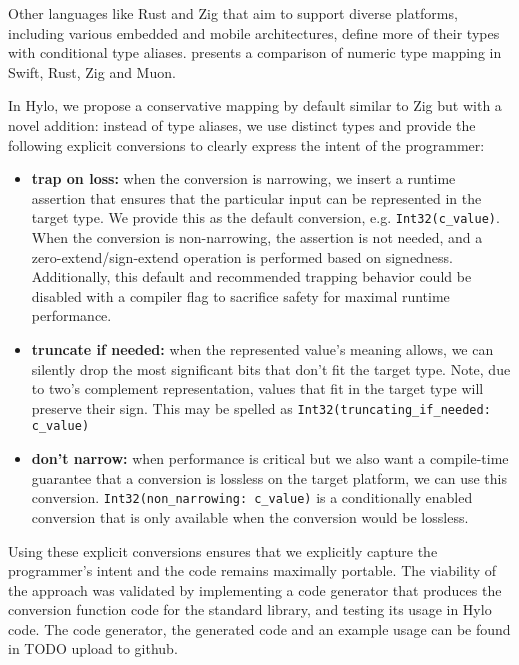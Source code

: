 Other languages like Rust and Zig that aim to support diverse platforms, including various embedded and mobile architectures, define more of their types with conditional type aliases.  presents a comparison of numeric type mapping in Swift, Rust, Zig and Muon.

In Hylo, we propose a conservative mapping by default similar to Zig but with a novel addition: instead of type aliases, we use distinct types and provide the following explicit conversions to clearly express the intent of the programmer:
\begin{itemize}
    \item \textbf{trap on loss:} when the conversion is narrowing, we insert a runtime assertion that ensures that the particular input can be represented in the target type. We provide this as the default conversion, e.g. \texttt{Int32(c\_value)}. When the conversion is non-narrowing, the assertion is not needed, and a zero-extend/sign-extend operation is performed based on signedness. Additionally, this default and recommended trapping behavior could be disabled with a compiler flag to sacrifice safety for maximal runtime performance.
    \item \textbf{truncate if needed:} when the represented value's meaning allows, we can silently drop the most significant bits that don't fit the target type. Note, due to two's complement representation, values that fit in the target type will preserve their sign. This may be spelled as \texttt{Int32(truncating\_if\_needed: c\_value)}
    \item \textbf{don't narrow:} when performance is critical but we also want a compile-time guarantee that a conversion is lossless on the target platform, we can use this conversion. \texttt{Int32(non\_narrowing: c\_value)} is a conditionally enabled conversion that is only available when the conversion would be lossless.
\end{itemize}
Using these explicit conversions ensures that we explicitly capture the programmer's intent and the code remains maximally portable. The viability of the approach was validated by implementing a code generator that produces the conversion function code for the standard library, and testing its usage in Hylo code. The code generator, the generated code and an example usage can be found in TODO upload to github.


